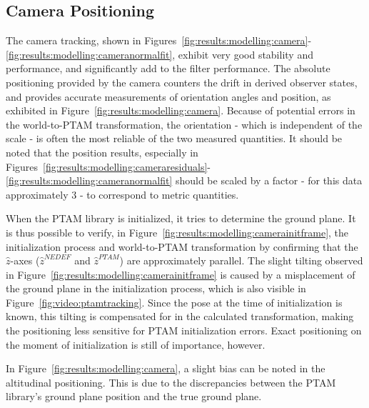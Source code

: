     \subsection{Camera Positioning}
        The camera tracking, shown in Figures~\ref{fig:results:modelling:camera}-\ref{fig:results:modelling:cameranormalfit},
        exhibit very good stability and performance, and significantly add to
        the filter performance. The absolute positioning provided by the
        camera counters the drift in derived observer states,
        and provides accurate measurements of orientation angles and position, as
        exhibited in Figure~\ref{fig:results:modelling:camera}.
        Because of potential errors in the world-to-PTAM transformation, the orientation - which
        is independent of the scale - is often the most reliable of the two measured quantities.
        It should be noted that the position results, especially in
        Figures~\ref{fig:results:modelling:cameraresiduals}-\ref{fig:results:modelling:cameranormalfit}
        should be scaled by a factor - for this data approximately $3$ - to correspond
        to metric quantities.

        When the PTAM library is initialized, it tries to determine the
        ground plane.
        It is thus possible to verify, in Figure~\ref{fig:results:modelling:camerainitframe},
        the initialization process and world-to-PTAM transformation
        by confirming that the $\hat{z}$-axes ($\hat{z}^{NEDEF}$ and $\hat{z}^{PTAM}$) are approximately parallel.
        The slight tilting observed in Figure~\ref{fig:results:modelling:camerainitframe}
        is caused by a misplacement of the ground plane in the initialization process,
        which is also visible in Figure~\ref{fig:video:ptamtracking}.
        Since the pose at the time of initialization is known, this tilting
        is compensated for in the calculated transformation, making the positioning
        less sensitive for PTAM initialization errors.
        Exact positioning on the moment of initialization is still of importance, however.

        In Figure~\ref{fig:results:modelling:camera}, a slight bias can be noted in the altitudinal positioning.
        This is due to the discrepancies between the PTAM library's ground plane position
        and the true ground plane.

